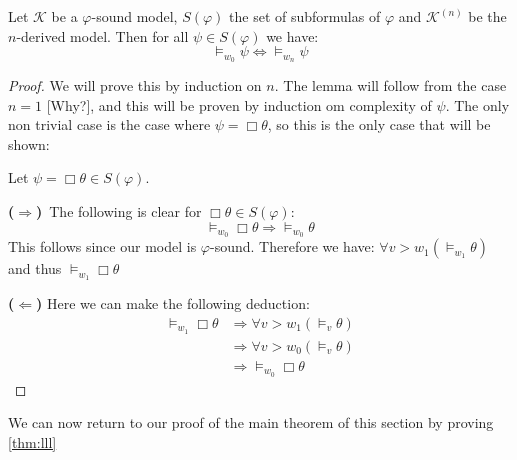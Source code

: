 \documentclass[../main.tex]{subfiles}
\begin{document}
\begin{lem}
	\label{lem:GLS}
	Let $\mathcal{K}$ be a $\varphi$-sound model, $S(\varphi)$ the set of
	subformulas of $\varphi$ and $\mathcal{K}^{(n)}$ be the $n$-derived
	model. Then for all $\psi\in S(\varphi)$ we have:
	$$\vDash_{w_0}\psi\Leftrightarrow\vDash_{w_n}\psi$$
\end{lem}
\begin{proof}
	We will prove this by induction on $n$. The lemma will follow from the
	case $n=1$ [Why?], and this will be proven by induction om complexity
	of $\psi$. The only non trivial case is the case where
	$\psi=\Box\theta$, so this is the only case that will be shown:

	Let $\psi=\Box\theta\in S(\varphi)$. 

	\textbf{($\Rightarrow$)}\ The following is clear for
	$\Box\theta\in S(\varphi)$:
	$$\vDash_{w_0}\Box\theta\Rightarrow\vDash_{w_0}\theta$$
	This follows since our model is $\varphi$-sound. Therefore we have:
	$\forall v>w_1(\vDash_{w_1}\theta)$ and thus $\vDash_{w_1}\Box\theta$

	\textbf{($\Leftarrow$)} Here we can make the following deduction:
	\begin{align*}
		\vDash_{w_1}\Box\theta&\Rightarrow\forall
		v>w_1(\vDash_v\theta)\\
				      &\Rightarrow\forall
				      v>w_0(\vDash_v\theta)\\
				      &\Rightarrow\vDash_{w_0}\Box\theta
	\end{align*}
\end{proof}
We can now return to our proof of the main theorem of this section by proving
\ref{thm:lll}
\end{document}
